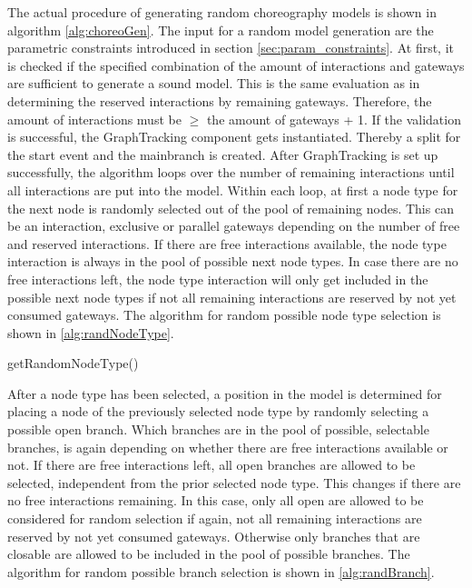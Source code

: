 The actual procedure of generating random choreography models is shown in algorithm \ref{alg:choreoGen}. The input for a random model generation are the parametric constraints introduced in section \ref{sec:param_constraints}. At first, it is checked if the specified combination of the amount of interactions and gateways are sufficient to generate a sound model. This is the same evaluation as in determining the reserved interactions by remaining gateways. Therefore, the amount of interactions must be $\geq$ the amount of gateways + 1. If the validation is successful, the GraphTracking component gets instantiated. Thereby a split for the start event and the mainbranch is created. After GraphTracking is set up successfully, the algorithm loops over the number of remaining interactions until all interactions are put into the model. Within each loop, at first a node type for the next node is randomly selected out of the pool of remaining nodes. This can be an interaction, exclusive or parallel gateways depending on the number of free and reserved interactions. If there are free interactions available, the node type interaction is always in the pool of possible next node types. In case there are no free interactions left, the node type interaction will only get included in the possible next node types if not all remaining interactions are reserved by not yet consumed gateways. The algorithm for random possible node type selection is shown in \ref{alg:randNodeType}.\\

\begin{algorithm}[H]
\DontPrintSemicolon
\SetAlgoLined
{}
\caption{getRandomNodeType()}
\label{alg:randNodeType}
\end{algorithm}

After a node type has been selected, a position in the model is determined for placing a node of the previously selected node type by randomly selecting a possible open branch. Which branches are in the pool of possible, selectable branches, is again depending on whether there are free interactions available or not. If there are free interactions left, all open branches are allowed to be selected, independent from the prior selected node type. This changes if there are no free interactions remaining. In this case, only all open are allowed to be considered for random selection if again, not all remaining interactions are reserved by not yet consumed gateways. Otherwise only branches that are closable are allowed to be included in the pool of possible branches. The algorithm for random possible branch selection is shown in \ref{alg:randBranch}.\\

